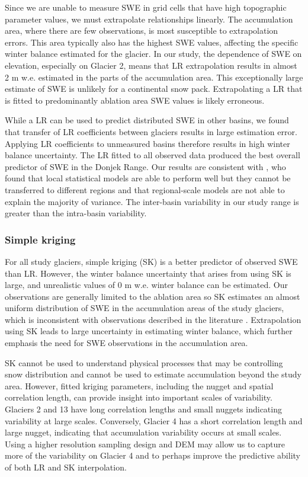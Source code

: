 \documentclass[review,oneside, letterpaper]{igs}
\begin{document}
Since we are unable to measure SWE in grid cells that have high topographic parameter values, we must extrapolate relationships linearly. The accumulation area, where there are few observations, is most susceptible to extrapolation errors. This area typically also has the highest SWE values, affecting the specific winter balance estimated for the glacier. In our study, the dependence of SWE on elevation, especially on Glacier 2, means that LR extrapolation results in almost 2 m w.e. estimated in the parts of the accumulation area. This exceptionally large estimate of SWE is unlikely for a continental snow pack. Extrapolating a LR that is fitted to predominantly ablation area SWE values is likely erroneous. 

While a LR can be used to predict distributed SWE in other basins, we found that transfer of LR coefficients between glaciers results in large estimation error. Applying LR coefficients to unmeasured basins therefore results in high winter balance uncertainty. The LR fitted to all observed data produced the best overall predictor of SWE in the Donjek Range. Our results are consistent with \cite{Grunewald2013}, who found that local statistical models are able to perform well but they cannot be transferred to different regions and that regional-scale models are not able to explain the majority of variance. The inter-basin variability in our study range is greater than the intra-basin variability. 

\subsubsection{Simple kriging}

For all study glaciers, simple kriging (SK) is a better predictor of observed SWE than LR. However, the winter balance uncertainty that arises from using SK is large, and unrealistic values of 0 m w.e. winter balance can be estimated. Our observations are generally limited to the ablation area so SK estimates an almost uniform distribution of SWE in the accumulation areas of the study glaciers, which is inconsistent with observations described in the literature \citep[e.g.][]{Machguth2006, Grabiec2011}. Extrapolation using SK leads to large uncertainty in estimating winter balance, which further emphasis the need for SWE observations in the accumulation area. 

SK cannot be used to understand physical processes that may be controlling snow distribution and cannot be used to estimate accumulation beyond the study area. However, fitted kriging parameters, including the nugget and spatial correlation length, can provide insight into important scales of variability. Glaciers 2 and 13 have long correlation lengths and small nuggets indicating variability at large scales. Conversely, Glacier 4 has a short correlation length and large nugget, indicating that accumulation variability occurs at small scales. Using a higher resolution sampling design and DEM may allow us to capture more of the variability on Glacier 4 and to perhaps improve the predictive ability of both LR and SK interpolation. 
\end{document}
